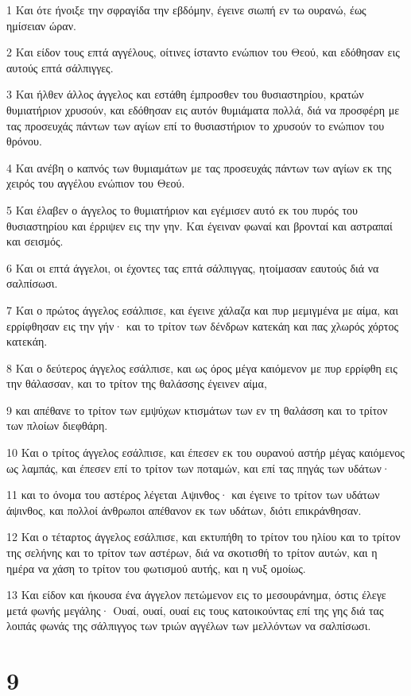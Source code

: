 \par 1 Και ότε ήνοιξε την σφραγίδα την εβδόμην, έγεινε σιωπή εν τω ουρανώ, έως ημίσειαν ώραν.
\par 2 Και είδον τους επτά αγγέλους, οίτινες ίσταντο ενώπιον του Θεού, και εδόθησαν εις αυτούς επτά σάλπιγγες.
\par 3 Και ήλθεν άλλος άγγελος και εστάθη έμπροσθεν του θυσιαστηρίου, κρατών θυμιατήριον χρυσούν, και εδόθησαν εις αυτόν θυμιάματα πολλά, διά να προσφέρη με τας προσευχάς πάντων των αγίων επί το θυσιαστήριον το χρυσούν το ενώπιον του θρόνου.
\par 4 Και ανέβη ο καπνός των θυμιαμάτων με τας προσευχάς πάντων των αγίων εκ της χειρός του αγγέλου ενώπιον του Θεού.
\par 5 Και έλαβεν ο άγγελος το θυμιατήριον και εγέμισεν αυτό εκ του πυρός του θυσιαστηρίου και έρριψεν εις την γην. Και έγειναν φωναί και βρονταί και αστραπαί και σεισμός.
\par 6 Και οι επτά άγγελοι, οι έχοντες τας επτά σάλπιγγας, ητοίμασαν εαυτούς διά να σαλπίσωσι.
\par 7 Και ο πρώτος άγγελος εσάλπισε, και έγεινε χάλαζα και πυρ μεμιγμένα με αίμα, και ερρίφθησαν εις την γήν· και το τρίτον των δένδρων κατεκάη και πας χλωρός χόρτος κατεκάη.
\par 8 Και ο δεύτερος άγγελος εσάλπισε, και ως όρος μέγα καιόμενον με πυρ ερρίφθη εις την θάλασσαν, και το τρίτον της θαλάσσης έγεινεν αίμα,
\par 9 και απέθανε το τρίτον των εμψύχων κτισμάτων των εν τη θαλάσση και το τρίτον των πλοίων διεφθάρη.
\par 10 Και ο τρίτος άγγελος εσάλπισε, και έπεσεν εκ του ουρανού αστήρ μέγας καιόμενος ως λαμπάς, και έπεσεν επί το τρίτον των ποταμών, και επί τας πηγάς των υδάτων·
\par 11 και το όνομα του αστέρος λέγεται Αψινθος· και έγεινε το τρίτον των υδάτων άψινθος, και πολλοί άνθρωποι απέθανον εκ των υδάτων, διότι επικράνθησαν.
\par 12 Και ο τέταρτος άγγελος εσάλπισε, και εκτυπήθη το τρίτον του ηλίου και το τρίτον της σελήνης και το τρίτον των αστέρων, διά να σκοτισθή το τρίτον αυτών, και η ημέρα να χάση το τρίτον του φωτισμού αυτής, και η νυξ ομοίως.
\par 13 Και είδον και ήκουσα ένα άγγελον πετώμενον εις το μεσουράνημα, όστις έλεγε μετά φωνής μεγάλης· Ουαί, ουαί, ουαί εις τους κατοικούντας επί της γης διά τας λοιπάς φωνάς της σάλπιγγος των τριών αγγέλων των μελλόντων να σαλπίσωσι.

\chapter{9}

